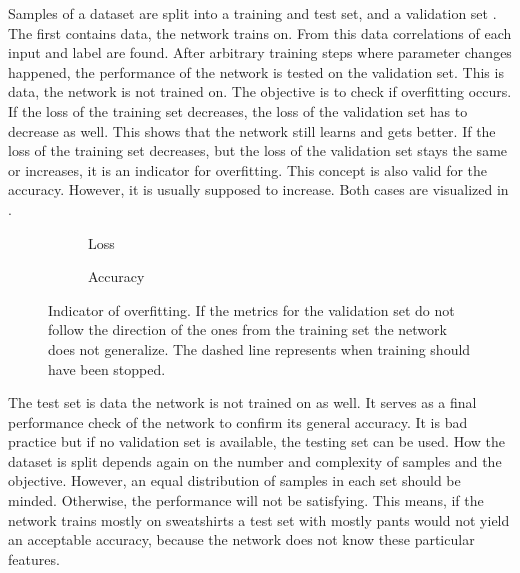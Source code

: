 Samples of a dataset are split into a training and test set, and a validation set \cite{James2014}.
The first contains data, the network trains on.
From this data correlations of each input and label are found.
After arbitrary training steps where parameter changes happened, the performance of the network is tested on the validation set.
This is data, the network is not trained on.
The objective is to check if overfitting occurs.
If the loss of the training set decreases, the loss of the validation set has to decrease as well.
This shows that the network still learns and gets better.
If the loss of the training set decreases, but the loss of the validation set stays the same or increases, it is an indicator for overfitting.
This concept is also valid for the accuracy.
However, it is usually supposed to increase.
Both cases are visualized in .
\begin{figure}
	\setlength{}
	\setlength{}
	\centering
	\begin{subfigure}{.5\textwidth}
		
		\caption[Loss]{Loss}
	\end{subfigure}%
	\begin{subfigure}{.5\textwidth}
		
		\caption[Accuracy]{Accuracy}
	\end{subfigure}
	\caption[Indicator of overfitting]{Indicator of overfitting. If the metrics for the validation set do not follow the direction of the ones from the training set the network does not generalize. The dashed line represents when training should have been stopped.}
	\label{fig:overfitting}
\end{figure}

The test set is data the network is not trained on as well.
It serves as a final performance check of the network to confirm its general accuracy.
It is bad practice but if no validation set is available, the testing set can be used.
How the dataset is split depends again on the number and complexity of samples and the objective.
However, an equal distribution of samples in each set should be minded.
Otherwise, the performance will not be satisfying.
This means, if the network trains mostly on sweatshirts a test set with mostly pants would not yield an acceptable accuracy, because the network does not know these particular features.

